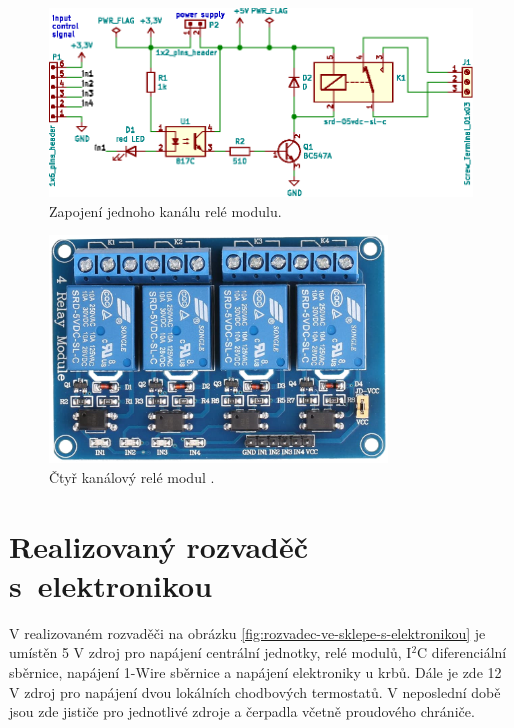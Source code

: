 \begin{figure}[H]
    \centering
    \includegraphics[width=\textwidth]{images/svg/kicad/rele-modul-jeden-kanal.eps}
    \caption{Zapojení jednoho kanálu relé modulu.}
    \label{fig:rele-modul-jeden-kanal}
\end{figure}


\begin{figure}[H]
    \centering
    \includegraphics[width=0.8\textwidth]{images/ctyr-kanalovy-rele-modul.png}
    \caption[Čtyř kanálový relé modul.]{Čtyř kanálový relé modul \cite{ctyr-kanalovy-rele-modul}.}
    \label{fig:ctyr-kanalovy-rele-modul}
\end{figure}

\section{Realizovaný rozvaděč s~elektronikou}

V realizovaném rozvaděči na obrázku \ref{fig:rozvadec-ve-sklepe-s-elektronikou} je umístěn 5 V zdroj pro napájení centrální jednotky, relé modulů, I$^2$C diferenciální sběrnice, napájení 1-Wire sběrnice a napájení elektroniky u krbů. Dále je zde 12 V zdroj pro napájení dvou lokálních chodbových termostatů. V  neposlední době jsou zde jističe pro jednotlivé zdroje a čerpadla včetně proudového chrániče.

